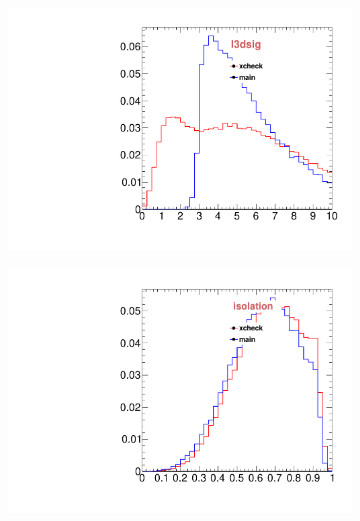 \begin{figure}
\begin{subfigure}[b]{0.2\textwidth}
                \includegraphics[width=\textwidth]{Figures/VariablesComparison/Data_barrel_figs/fls3d}
                \label{fig:Data_barrel_fls3d}
        \end{subfigure}
        \begin{subfigure}[b]{0.2\textwidth}
                \centering
                \includegraphics[width=\textwidth]{Figures/VariablesComparison/Data_barrel_figs/iso}
                \label{fig:Data_barrel_iso}
        \end{subfigure}
        \begin{subfigure}[b]{0.2\textwidth}
                \centering

\end{subfigure}
\end{figure}
